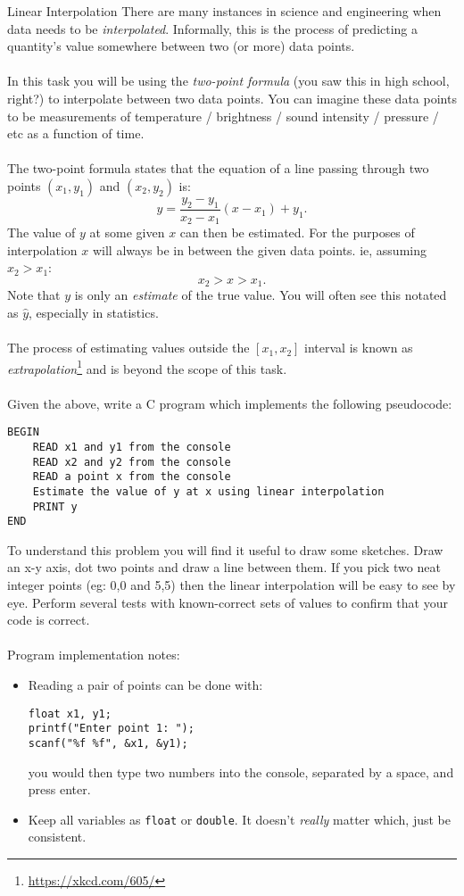 \documentclass{lab}
\begin{document}
\begin{task}{Linear Interpolation}{}
There are many instances in science and engineering when data needs to be \textit{interpolated}. Informally, this is the process of predicting a quantity's value somewhere between two (or more) data points.
\\ \\
In this task you will be using the \textit{two-point formula} (you saw this in high school, right?) to interpolate between two data points. You can imagine these data points to be measurements of temperature / brightness / sound intensity / pressure / etc as a function of time.\\ \\
The two-point formula states that the equation of a line passing through two points $(x_1, y_1)$ and $(x_2, y_2)$ is:
\begin{equation}
y = \frac{y_2 - y_1}{x_2 - x_1}(x - x_1) + y_1.
\end{equation}
The value of $y$ at some given $x$ can then be estimated. For the purposes of interpolation $x$ will always be in between the given data points. ie, assuming $x_2 > x_1$:
\begin{equation}
x_2 > x > x_1.
\end{equation}
Note that $y$ is only an \textit{estimate} of the true value. You will often see this notated as $\hat{y}$, especially in statistics.
\\ \\
The process of estimating values outside the $[x_1, x_2]$ interval is known as \textit{extrapolation}\footnote{\url{https://xkcd.com/605/}} and is beyond the scope of this task.
\\ \\
Given the above, write a C program which implements the following pseudocode:
\begin{lstlisting}[style=CStyle]
BEGIN
	READ x1 and y1 from the console
	READ x2 and y2 from the console
	READ a point x from the console
	Estimate the value of y at x using linear interpolation
	PRINT y
END
\end{lstlisting}
To understand this problem you will find it useful to draw some sketches. Draw an x-y axis, dot two points and draw a line between them. If you pick two neat integer points (eg: 0,0 and 5,5) then the linear interpolation will be easy to see by eye. Perform several tests with known-correct sets of values to confirm that your code is correct.
\\ \\
Program implementation notes:
\begin{itemize}[itemsep=1mm]
\item Reading a pair of points can be done with:
\begin{lstlisting}[style=CStyle]
float x1, y1;
printf("Enter point 1: ");
scanf("%f %f", &x1, &y1);
\end{lstlisting}
you would then type two numbers into the console, separated by a space, and press enter.
\item Keep all variables as \texttt{float} or \texttt{double}. It doesn't \textit{really} matter which, just be consistent.
\end{itemize}
\end{task}
\end{document}
